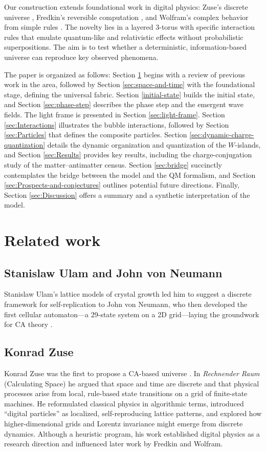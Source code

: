 \documentclass{ijuc}
\begin{document}
Our construction extends foundational work in digital physics: Zuse's discrete universe \cite{zuse}, Fredkin's reversible computation \cite{fredkin}, and Wolfram's complex behavior from simple rules \cite{wolfram}. The novelty lies in a layered 3-torus with specific interaction rules that emulate quantum-like and relativistic effects without probabilistic superpositions. The aim is to test whether a deterministic, information-based universe can reproduce key observed phenomena.

The paper is organized as follows: Section \ref{sec:related-work} begins with a review of previous work in the area, followed by Section \ref{sec:space-and-time} with the foundational stage, defining the universal fabric. 
Section \ref{initial-state} builds the initial state, and Section \ref{sec:phase-step} describes the phase step and the emergent wave fields. 
The light frame is presented in Section \ref{sec:light-frame}. 
Section \ref{sec:Interactions} illustrates the bubble interactions, followed by Section \ref{sec:Particles} that defines the composite particles. 
Section \ref{sec:dynamic-charge-quantization} details the dynamic organization and quantization of the $W$-islands, and Section \ref{sec:Results} provides key results, including the charge-conjugation study of the matter--antimatter census. 
Section \ref{sec:bridge} succinctly contemplates the bridge between the model and the QM formalism, and Section \ref{sec:Prospects-and-conjectures} outlines potential future directions. 
Finally, Section \ref{sec:Discussion} offers a summary and a synthetic interpretation of the model.

\section{Related work} \label{sec:related-work}

\subsection*{Stanislaw Ulam and John von Neumann}
Stanislaw Ulam's lattice models of crystal growth led him to suggest a discrete framework for self-replication to John von Neumann, who then developed the first cellular automaton---a 29-state system on a 2D grid---laying the groundwork for CA theory \cite{ulam1952,vonNeumann1966}.

\subsection*{Konrad Zuse}
Konrad Zuse was the first to propose a CA-based universe \cite{zuse}. In \emph{Rechnender Raum} (Calculating Space) he argued that space and time are discrete and that physical processes arise from local, rule-based state transitions on a grid of finite-state machines. He reformulated classical physics in algorithmic terms, introduced ``digital particles'' as localized, self-reproducing lattice patterns, and explored how higher-dimensional grids and Lorentz invariance might emerge from discrete dynamics. Although a heuristic program, his work established digital physics as a research direction and influenced later work by Fredkin and Wolfram.
\end{document}
